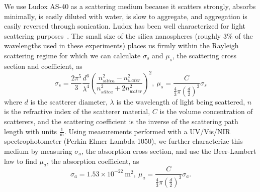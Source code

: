 We use Ludox AS-40 as a scattering medium because it scatters strongly, absorbs minimally, is easily diluted with water, is slow to aggregate, and aggregation is easily reversed through sonication. Ludox has been well characterized for light scattering purposes~\cite{dezelic_determination_1960,bonnelycke_light_1959,goring_light-scattering_1957}. The small size of the silica nanospheres (roughly 3\% of the wavelengths used in these experiments) places us firmly within the Rayleigh scattering regime for which we can calculate $\sigma_{s}$ and $\mu_{s}$, the scattering cross section and coefficient, as~\cite{bohren_absorption_1983, chandrasekhar_radiative_1950} 
%
\begin{equation}\label{eq:scatter}
    \sigma_{s} =  \frac{2 \pi^{5}}{3} \frac{d^{6}}{\lambda^{4}}\left(\frac{n_{silica}^{2}-n_{water}^{2}}{n_{silica}^{2}+2n_{water}^{2}}\right)^{2},\ \mu_{s} = \frac{C}{\frac{4}{3} \pi \left(\frac{d}{2}\right)^{3}} \sigma_{s}
\end{equation}
%
where $d$ is the scatterer diameter, $\lambda$ is the wavelength of light being scattered, $n$ is the refractive index of the scatterer material, $C$ is the volume concentration of scatterers, and the scattering coefficient is the inverse of the scattering path length with units $\frac{1}{\textrm{m}}$. Using measurements performed with a UV/Vis/NIR spectrophotometer (Perkin Elmer Lambda-1050), we further characterize this medium by measuring $\sigma_{a}$, the absorption cross section, and use the Beer-Lambert law to find $\mu_{a}$, the absorption coefficient, as~\cite{lakowicz_principles_2006} 
%
\begin{equation}\label{eq:absorb}
    \sigma_{a} = 1.53\times 10^{-22}\ \textrm{m}^{2},\ \mu_{a} = \frac{C}{\frac{4}{3} \pi \left(\frac{d}{2}\right)^{3}} \sigma_{a}.
\end{equation}
%
%

